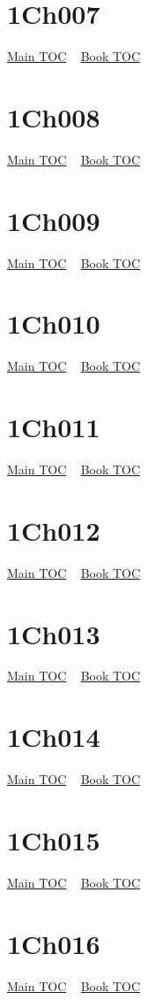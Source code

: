\documentclass{book}
\begin{document}
  \section{1Ch007}\hyperlink{toc}{Main TOC} ~ \hyperref[subsec:1Ch]{Book TOC} 
  \section{1Ch008}\hyperlink{toc}{Main TOC} ~ \hyperref[subsec:1Ch]{Book TOC} 
  \section{1Ch009}\hyperlink{toc}{Main TOC} ~ \hyperref[subsec:1Ch]{Book TOC} 
  \section{1Ch010}\hyperlink{toc}{Main TOC} ~ \hyperref[subsec:1Ch]{Book TOC} 
  \section{1Ch011}\hyperlink{toc}{Main TOC} ~ \hyperref[subsec:1Ch]{Book TOC} 
  \section{1Ch012}\hyperlink{toc}{Main TOC} ~ \hyperref[subsec:1Ch]{Book TOC} 
  \section{1Ch013}\hyperlink{toc}{Main TOC} ~ \hyperref[subsec:1Ch]{Book TOC} 
  \section{1Ch014}\hyperlink{toc}{Main TOC} ~ \hyperref[subsec:1Ch]{Book TOC} 
  \section{1Ch015}\hyperlink{toc}{Main TOC} ~ \hyperref[subsec:1Ch]{Book TOC} 
  \section{1Ch016}\hyperlink{toc}{Main TOC} ~ \hyperref[subsec:1Ch]{Book TOC} 
\end{document}
